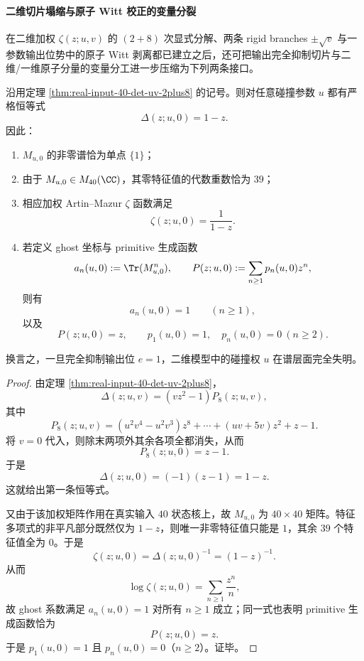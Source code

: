 \paragraph{二维切片塌缩与原子 Witt 校正的变量分裂}
在二维加权 \(\zeta(z;u,v)\) 的 \((2+8)\) 次显式分解、两条 rigid branches \(\pm\sqrt v\) 与一参数输出位势中的原子 Witt 剥离都已建立之后，还可把输出完全抑制切片与二维/一维原子分量的变量分工进一步压缩为下列两条接口。

\begin{theorem}[二维加权 \texorpdfstring{$\zeta(z;u,v)$}{zeta(z;u,v)} 在 \texorpdfstring{$v=0$}{v=0} 切片上的完全谱塌缩]\label{thm:xi-time-part73a-twoparam-vzero-total-spectral-collapse}
沿用定理 \ref{thm:real-input-40-det-uv-2plus8} 的记号。则对任意碰撞参数 \(u\) 都有严格恒等式
\[
\boxed{\;
\Delta(z;u,0)=1-z.\;}
\]
因此：
\begin{enumerate}
  \item \(M_{u,0}\) 的非零谱恰为单点 \(\{1\}\)；
  \item 由于 \(M_{u,0}\in M_{40}(\CC)\)，其零特征值的代数重数恰为 \(39\)；
  \item 相应加权 Artin--Mazur \(\zeta\) 函数满足
  \[
  \boxed{\;
  \zeta(z;u,0)=\frac{1}{1-z}.\;}
  \]
  \item 若定义 ghost 坐标与 primitive 生成函数
  \[
  a_n(u,0):=\Tr(M_{u,0}^n),
  \qquad
  P(z;u,0):=\sum_{n\ge 1}p_n(u,0)z^n,
  \]
  则有
  \[
  \boxed{\;
  a_n(u,0)=1\qquad(n\ge 1),\;}
  \]
  以及
  \[
  \boxed{\;
  P(z;u,0)=z,\qquad
  p_1(u,0)=1,\quad p_n(u,0)=0\ (n\ge 2).\;}
  \]
\end{enumerate}
换言之，一旦完全抑制输出位 \(e=1\)，二维模型中的碰撞权 \(u\) 在谱层面完全失明。
\end{theorem}
\begin{proof}
由定理 \ref{thm:real-input-40-det-uv-2plus8}，
\[
\Delta(z;u,v)=(v z^2-1)P_8(z;u,v),
\]
其中
\[
P_8(z;u,v)
=
(u^2 v^4-u^2 v^3)z^8+\cdots +(uv+5v)z^2+z-1.
\]
将 \(v=0\) 代入，则除末两项外其余各项全都消失，从而
\[
P_8(z;u,0)=z-1.
\]
于是
\[
\Delta(z;u,0)=(-1)(z-1)=1-z.
\]
这就给出第一条恒等式。

又由于该加权矩阵作用在真实输入 \(40\) 状态核上，故 \(M_{u,0}\) 为 \(40\times 40\) 矩阵。特征多项式的非平凡部分既然仅为 \(1-z\)，则唯一非零特征值只能是 \(1\)，其余 \(39\) 个特征值全为 \(0\)。于是
\[
\zeta(z;u,0)=\Delta(z;u,0)^{-1}=(1-z)^{-1}.
\]
从而
\[
\log\zeta(z;u,0)=\sum_{n\ge 1}\frac{z^n}{n},
\]
故 ghost 系数满足 \(a_n(u,0)=1\) 对所有 \(n\ge 1\) 成立；同一式也表明 primitive 生成函数恰为
\[
P(z;u,0)=z.
\]
于是 \(p_1(u,0)=1\) 且 \(p_n(u,0)=0\)（\(n\ge 2\)）。证毕。
\end{proof}

